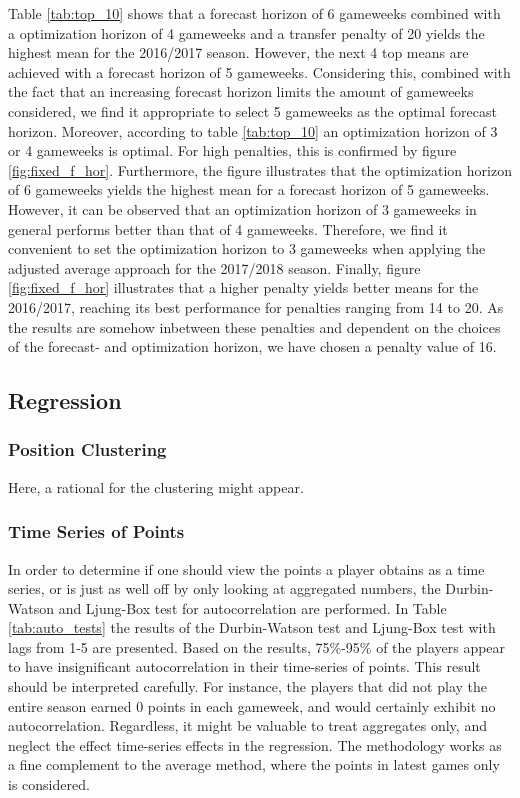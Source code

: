 Table \ref{tab:top_10} shows that a forecast horizon of 6 gameweeks combined with a optimization horizon of 4 gameweeks and a transfer penalty of 20 yields the highest mean for the 2016/2017 season. However, the next 4 top means are achieved with a forecast horizon of 5 gameweeks. Considering this, combined with the fact that an increasing forecast horizon limits the amount of gameweeks considered, we find it appropriate to select 5 gameweeks as the optimal forecast horizon. Moreover, according to table \ref{tab:top_10} an optimization horizon of 3 or 4 gameweeks is optimal. For high penalties, this is confirmed by figure \ref{fig:fixed_f_hor}. Furthermore, the figure illustrates that the optimization horizon of 6 gameweeks yields the highest mean for a forecast horizon of 5 gameweeks. However, it can be observed that an optimization horizon of 3 gameweeks in general performs better than that of 4 gameweeks. Therefore, we find it convenient to set the optimization horizon to 3 gameweeks when applying the adjusted average approach for the 2017/2018 season. Finally, figure \ref{fig:fixed_f_hor} illustrates that a higher penalty yields better means for the 2016/2017, reaching its best performance for penalties ranging from 14 to 20. As the results are somehow inbetween these penalties and dependent on the choices of the forecast- and optimization horizon, we have chosen a penalty value of 16. 

\subsection{Regression}

\subsubsection{Position Clustering}

Here, a rational for the clustering might appear.

\subsubsection{Time Series of Points}

In order to determine if one should view the points a player obtains as a time series, or is just as well off by only looking at aggregated numbers, the Durbin-Watson and Ljung-Box test for autocorrelation are performed. In Table \ref{tab:auto_tests} the results of the Durbin-Watson test and Ljung-Box test with lags from 1-5 are presented. Based on the results, 75\%-95\% of the players appear to have insignificant autocorrelation in their time-series of points. This result should be interpreted carefully. For instance, the players that did not play the entire season earned 0 points in each gameweek, and would certainly exhibit no autocorrelation. Regardless, it might be valuable to treat aggregates only, and neglect the effect time-series effects in the regression. The methodology works as a fine complement to the average method, where the points in latest games only is considered.

